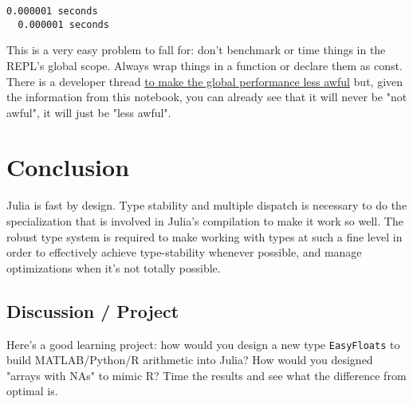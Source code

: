 \documentclass[11pt]{article}
\begin{document}
    \begin{Verbatim}[commandchars=\\\{\}]
  0.000001 seconds
  0.000001 seconds

    \end{Verbatim}

    This is a very easy problem to fall for: don't benchmark or time things
in the REPL's global scope. Always wrap things in a function or declare
them as const. There is a developer thread
\href{https://github.com/JuliaLang/julia/issues/8870}{to make the global
performance less awful} but, given the information from this notebook,
you can already see that it will never be "not awful", it will just be
"less awful".

    \section{Conclusion}\label{conclusion}

Julia is fast by design. Type stability and multiple dispatch is
necessary to do the specialization that is involved in Julia's
compilation to make it work so well. The robust type system is required
to make working with types at such a fine level in order to effectively
achieve type-stability whenever possible, and manage optimizations when
it's not totally possible.

\subsection{Discussion / Project}\label{discussion-project}

Here's a good learning project: how would you design a new type
\texttt{EasyFloats} to build MATLAB/Python/R arithmetic into Julia? How
would you designed "arrays with NAs" to mimic R? Time the results and
see what the difference from optimal is.


    
    
    
    
\end{document}
